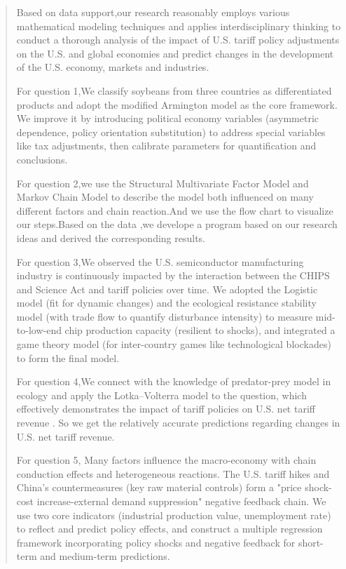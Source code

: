 \documentclass{apmcmthesis}
\begin{document}
\pagestyle{frontmatterstyle}

\begin{abstract}
Based on data support,our research reasonably employs various mathematical modeling techniques and applies interdisciplinary thinking to conduct a thorough analysis of the impact of U.S. tariff policy adjustments on the U.S. and global economies and predict changes in the development of the U.S. economy, markets and industries.

For question 1,We classify soybeans from three countries as differentiated products and adopt the modified Armington model as the core framework. We improve it by introducing political economy variables (asymmetric dependence, policy orientation substitution) to address special variables like tax adjustments, then calibrate parameters for quantification and conclusions.

For question 2,we use the Structural Multivariate Factor Model and Markov Chain Model to describe the model both influenced on many different factors and chain reaction.And we use the flow chart to visualize our steps.Based on the data ,we  develope a program based on our research ideas and derived the corresponding results.

For question 3,We observed the U.S. semiconductor manufacturing industry is continuously impacted by the interaction between the CHIPS and Science Act and tariff policies over time. We adopted the Logistic model (fit for dynamic changes) and the ecological resistance stability model (with trade flow to quantify disturbance intensity) to measure mid-to-low-end chip production capacity (resilient to shocks), and integrated a game theory model (for inter-country games like technological blockades) to form the final model.

For question 4,We connect with the knowledge of predator-prey model in ecology and apply the Lotka–Volterra model to the question, which effectively demonstrates the impact of tariff policies on U.S. net tariff revenue . So we get the relatively accurate predictions regarding changes in U.S. net tariff revenue.

For question 5, Many factors influence the macro-economy with chain conduction effects and heterogeneous reactions. The U.S. tariff hikes and China’s countermeasures (key raw material controls) form a "price shock-cost increase-external demand suppression" negative feedback chain. We use two core indicators (industrial production value, unemployment rate) to reflect and predict policy effects, and construct a multiple regression framework incorporating policy shocks and negative feedback for short-term and medium-term predictions.





\end{abstract}
\end{document}
